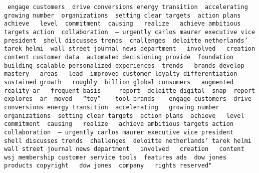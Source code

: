 \documentclass[
]{article}
\begin{document}
\begin{verbatim}
 engage customers  drive conversions energy transition  accelerating   growing number  organizations  setting clear targets  action plans  achieve   level  commitment  causing   realize   achieve ambitious targets action  collaboration  — urgently carlos maurer executive vice president  shell discusses trends  challenges  deloitte netherlands’ tarek helmi  wall street journal news department   involved   creation   content customer data  automated decisioning provide  foundation  building scalable personalized experiences  trends   brands develop mastery   areas   lead  improved customer loyalty differentiation  sustained growth   roughly  billion global consumers   augmented reality ar   frequent basis     report  deloitte digital  snap  report explores  ar  moved   “toy”    tool brands    engage customers  drive conversions energy transition  accelerating   growing number  organizations  setting clear targets  action plans  achieve   level  commitment  causing   realize   achieve ambitious targets action  collaboration  — urgently carlos maurer executive vice president  shell discusses trends  challenges  deloitte netherlands’ tarek helmi  wall street journal news department   involved   creation   content wsj membership customer service tools  features ads  dow jones products copyright   dow jones  company   rights reserved"                                                                                                                                                                                                                                                                                                                                                                                                                                                                                                                                                                                                                                                                                                                                                                                                                                                                                                                                                                                                                                                                                                                                                                                                                                                                                                                                                                                                                                                                                                                                                                                                                                                                                                                                                                                                                                                                                                                                                                                                                                                  
\end{verbatim}
\end{document}
